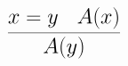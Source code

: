 \documentclass[14pt,border=2pt]{standalone}
\begin{document}
        $$
        \LARGE 

\begin{prooftree}
\hypo{x = y}
\hypo{A(x)}
\infer2{A(y)}
\end{prooftree}
        $$
        
\end{document}
